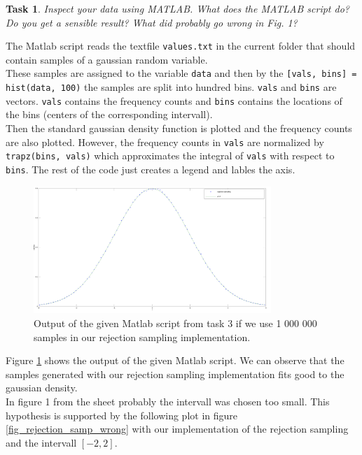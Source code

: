 \documentclass{scrartcl}
\newtheorem{task}{Task}
\begin{document}
	\begin{task}
		Inspect your data using MATLAB. What does the MATLAB script do? Do you get a
		sensible result? What did probably go wrong in Fig. 1?
	\end{task}
	The Matlab script reads the textfile \texttt{values.txt} in the current folder that should contain samples of a gaussian random variable. \\
	These samples are assigned to the variable \texttt{data} and then by the \texttt{[vals, bins] = hist(data, 100)} the samples are split into hundred bins. \texttt{vals} and \texttt{bins} are vectors. \texttt{vals} contains the frequency counts and \texttt{bins} contains the locations of the bins (centers of the corresponding intervall).  \\
	Then the standard gaussian density function is plotted and the frequency counts are also plotted. However, the frequency counts in \texttt{vals} are normalized by \texttt{trapz(bins, vals)} which approximates the integral of \texttt{vals} with respect to \texttt{bins}.
	The rest of the code just creates a legend and lables the axis.\\
		\begin{figure}[h]
			\centering
			\includegraphics[width=0.8\textwidth]{plot_rejection_sampling}
			\caption{Output of the given Matlab script from task 3 if we use 1 000 000 samples in our rejection sampling implementation.}
			\label{fig_rejection_samp}
			\end{figure}
	Figure \ref{fig_rejection_samp} shows the output of the given Matlab script. We can observe that the samples generated with our rejection sampling implementation fits good to the gaussian density. \\
	In figure 1 from the sheet probably the intervall was chosen too small. This hypothesis is supported by the following plot in figure \ref{fig_rejection_samp_wrong} with our implementation of the rejection sampling and the intervall $[-2,2]$.
\end{document}
